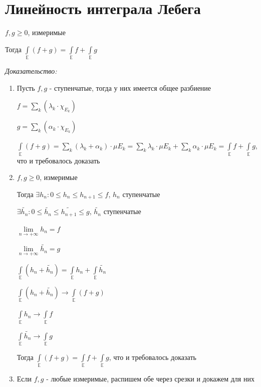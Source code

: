\documentclass[paper=a4, fontsize=17pt]{article}
\begin{document}
\section{Линейность интеграла Лебега}

$f, g \geqslant 0$, измеримые

Тогда $\int\limits_{\mathds{E}} (f + g) = \int\limits_{\mathds{E}} f + \int\limits_{\mathds{E}} g$

\emph{Доказательство:}

\begin{enumerate}
	\item Пусть $f, g$ - ступенчатые, тогда у них имеется общее разбиение

	$f = \sum\limits_{k}(\lambda_k \cdot \chi_{E_k})$

	$g = \sum\limits_{k}(\alpha_k \cdot \chi_{E_k})$

	$\int\limits_{\mathds{E}} (f + g) = \sum\limits_k (\lambda_k + \alpha_k) \cdot \mu E_k = \sum\limits_k \lambda_k \cdot \mu E_k + \sum\limits_k \alpha_k \cdot \mu E_k = \int\limits_{\mathds{E}} f + \int\limits_{\mathds{E}} g$, что и требовалось доказать

	\item $f, g \geqslant 0$, измеримые

	Тогда $\exists h_n: 0 \leqslant h_n \leqslant h_{n + 1} \leqslant f$, $h_n$ ступенчатые

	$\exists \widetilde{h_n}: 0 \leqslant \widetilde{h_n} \leqslant \widetilde{h_{n + 1}} \leqslant g$, $\widetilde{h_n}$ ступенчатые

	$\lim\limits_{n \rightarrow +\infty} h_n = f$

	$\lim\limits_{n \rightarrow +\infty} \widetilde{h_n} = g$

	$\int\limits_{\mathds{E}} (h_n + \widetilde{h_n}) = \int\limits_{\mathds{E}} h_n + \int\limits_{\mathds{E}} \widetilde{h_n}$

	$\int\limits_{\mathds{E}} (h_n + \widetilde{h_n}) \rightarrow \int\limits_{\mathds{E}} (f + g)$

	$\int\limits_{\mathds{E}} h_n \rightarrow \int\limits_{\mathds{E}} f$

	$\int\limits_{\mathds{E}} \widetilde{h_n} \rightarrow \int\limits_{\mathds{E}} g$

	Тогда $\int\limits_{\mathds{E}} (f + g) = \int\limits_{\mathds{E}} f + \int\limits_{\mathds{E}} g$, что и требовалось доказать

	\item
	Если $f, g$ - любые измеримые, распишем обе через срезки и докажем для них
\end{enumerate}
\end{document}
